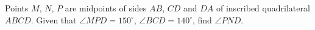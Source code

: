 \problem
Points $M$, $N$, $P$ are midpoints of sides $AB$, $CD$ and $DA$ of inscribed
quadrilateral $ABCD$.
Given that $\angle MPD = 150^\circ$, $\angle BCD = 140^\circ$, find
$\angle PND$.
\solution
\endproblem
